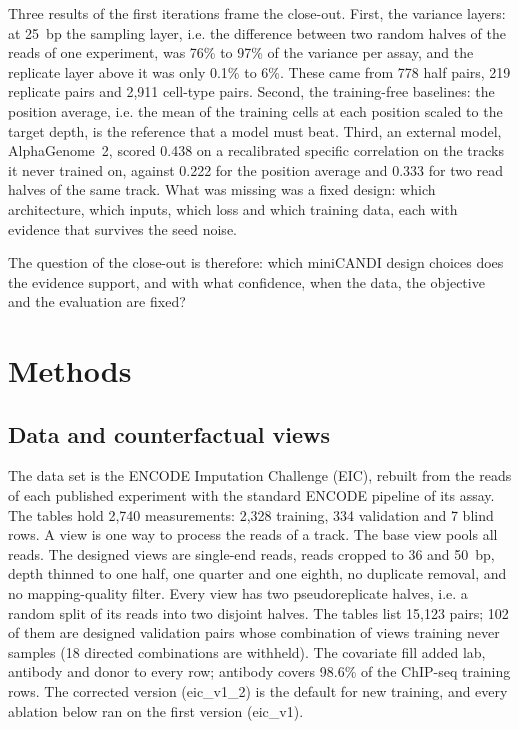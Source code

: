 \documentclass[pdflatex,sn-mathphys-num]{sn-jnl}
\newcommand{\lit}[1]{#1}
\newcommand{\cl}[1]{#1}
\newcommand{\abTrainPct}{98.6}
\newcommand{\agFair}{0.438}
\newcommand{\agFloor}{0.333}
\newcommand{\agPosAvg}{0.222}
\newcommand{\nCtPairs}{2{,}911}
\newcommand{\nHalfPairs}{778}
\newcommand{\nIsoPairs}{219}
\newcommand{\nNeverTrained}{102}
\newcommand{\nPairsAll}{15{,}123}
\newcommand{\nRows}{2{,}740}
\newcommand{\nRowsBlind}{7}
\newcommand{\nRowsTrain}{2{,}328}
\newcommand{\nRowsVal}{334}
\newcommand{\nWithheldCombos}{18}
\newcommand{\repHi}{6}
\newcommand{\repLo}{0.1}
\newcommand{\sampHi}{97}
\newcommand{\sampLo}{76}
\begin{document}
\cl{Three results of the first iterations frame the close-out. First, the variance layers: at \lit{25}~bp the sampling layer, i.e. the difference between two random halves of the reads of one experiment, was \sampLo{}\% to \sampHi{}\% of the variance per assay, and the replicate layer above it was only \repLo{}\% to \repHi{}\%. These came from \nHalfPairs{} half pairs, \nIsoPairs{} replicate pairs and \nCtPairs{} cell-type pairs. Second, the training-free baselines: the position average, i.e. the mean of the training cells at each position scaled to the target depth, is the reference that a model must beat. Third, an external model, AlphaGenome~\lit{2}, scored \agFair{} on a recalibrated specific correlation on the tracks it never trained on, against \agPosAvg{} for the position average and \agFloor{} for two read halves of the same track. What was missing was a fixed design: which architecture, which inputs, which loss and which training data, each with evidence that survives the seed noise.}

\cl{The question of the close-out is therefore: which miniCANDI design choices does the evidence support, and with what confidence, when the data, the objective and the evaluation are fixed?}

\section{Methods}\label{sec:methods}

\subsection{Data and counterfactual views}

\cl{The data set is the ENCODE Imputation Challenge (EIC), rebuilt from the reads of each published experiment with the standard ENCODE pipeline of its assay. The tables hold \nRows{} measurements: \nRowsTrain{} training, \nRowsVal{} validation and \nRowsBlind{} blind rows. A view is one way to process the reads of a track. The base view pools all reads. The designed views are single-end reads, reads cropped to \lit{36} and \lit{50}~bp, depth thinned to one half, one quarter and one eighth, no duplicate removal, and no mapping-quality filter. Every view has two pseudoreplicate halves, i.e. a random split of its reads into two disjoint halves. The tables list \nPairsAll{} pairs; \nNeverTrained{} of them are designed validation pairs whose combination of views training never samples (\nWithheldCombos{} directed combinations are withheld). The covariate fill added lab, antibody and donor to every row; antibody covers \abTrainPct{}\% of the ChIP-seq training rows. The corrected version (\lit{eic\_v1\_2}) is the default for new training, and every ablation below ran on the first version (\lit{eic\_v1}).}
\end{document}
